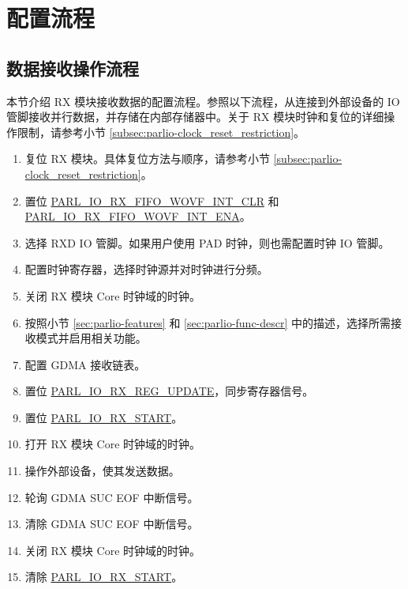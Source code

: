 \documentclass[main\_\_CN.tex]{subfiles}
\begin{document}

\section{配置流程}
\label{sec:parlio-prog-procedures}

\subsection{数据接收操作流程}

本节介绍 RX 模块接收数据的配置流程。参照以下流程，从连接到外部设备的 IO 管脚接收并行数据，并存储在内部存储器中。关于 RX 模块时钟和复位的详细操作限制，请参考小节 \ref{subsec:parlio-clock_reset_restriction}。

\begin{enumerate}
    \item 复位 RX 模块。具体复位方法与顺序，请参考小节 \ref{subsec:parlio-clock_reset_restriction}。
    \item 置位 \hyperref[fielddesc:PARLIORXFIFOWOVFINTCLR]{PARL\_IO\_RX\_FIFO\_WOVF\_INT\_CLR} 和 \hyperref[fielddesc:PARLIORXFIFOWOVFINTENA]{PARL\_IO\_RX\_FIFO\_WOVF\_INT\_ENA}。
    \item 选择 RXD IO 管脚。如果用户使用 PAD 时钟，则也需配置时钟 IO 管脚。
    \item 配置时钟寄存器，选择时钟源并对时钟进行分频。
    \item 关闭 RX 模块 Core 时钟域的时钟。
    \item 按照小节 \ref{sec:parlio-features} 和 \ref{sec:parlio-func-descr} 中的描述，选择所需接收模式并启用相关功能。
    \item 配置 GDMA 接收链表。
    \item 置位 \hyperref[fielddesc:PARLIORXREGUPDATE]{PARL\_IO\_RX\_REG\_UPDATE}，同步寄存器信号。
    \item 置位 \hyperref[fielddesc:PARLIORXSTART]{PARL\_IO\_RX\_START}。
    \item 打开 RX 模块 Core 时钟域的时钟。
    \item 操作外部设备，使其发送数据。
    \item 轮询 GDMA SUC EOF 中断信号。
    \item 清除 GDMA SUC EOF 中断信号。
    \item 关闭 RX 模块 Core 时钟域的时钟。
    \item 清除 \hyperref[fielddesc:PARLIORXSTART]{PARL\_IO\_RX\_START}。
\end{enumerate}
\end{document}
